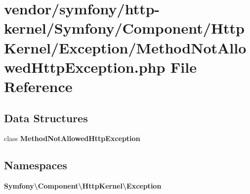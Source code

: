 \section{vendor/symfony/http-\/kernel/\+Symfony/\+Component/\+Http\+Kernel/\+Exception/\+Method\+Not\+Allowed\+Http\+Exception.php File Reference}
\label{_method_not_allowed_http_exception_8php}
\subsection*{Data Structures}
\begin{DoxyCompactItemize}
\item 
class {\bf Method\+Not\+Allowed\+Http\+Exception}
\end{DoxyCompactItemize}
\subsection*{Namespaces}
\begin{DoxyCompactItemize}
\item 
 {\bf Symfony\textbackslash{}\+Component\textbackslash{}\+Http\+Kernel\textbackslash{}\+Exception}
\end{DoxyCompactItemize}
